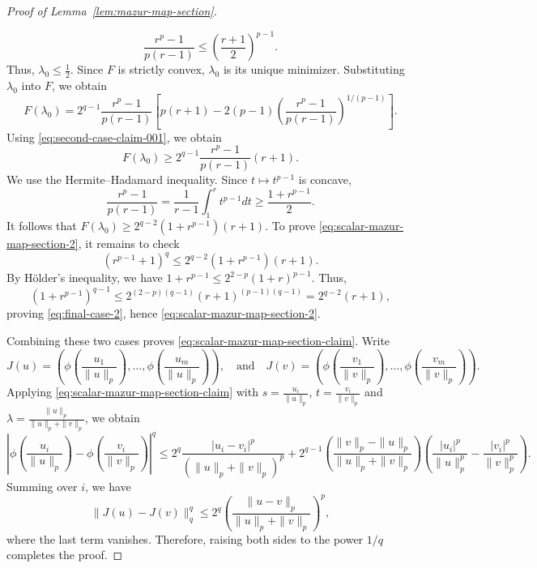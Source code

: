 \documentclass[10pt,a4paper]{amsart}
\begin{document}
\begin{proof}[Proof of Lemma~\ref{lem:mazur-map-section}]
\begin{enumerate}[wide =0pt, labelwidth= 1.1cm]
\begin{equation} \label{eq:second-case-claim-001}
\frac{r^p-1}{p(r-1)} \leq \left(\frac{r+1}{2}\right)^{p-1}.
\end{equation}
Thus, $\lambda_0 \leq \frac{1}{2}$. Since $F$ is strictly convex, $\lambda_0$ is its unique minimizer. Substituting $\lambda_0$ into $F$, we obtain
\[
    F(\lambda_0 ) = 2^{q-1} \frac{r^p-1}{p(r-1)}\left[p(r+1)-2(p-1)\left(\frac{r^p-1}{p(r-1)}\right)^{1 /(p-1)}\right].
\]
Using \eqref{eq:second-case-claim-001}, we obtain
$$
F\left(\lambda_0\right) \geq 2^{q-1} \frac{r^p-1}{p(r-1)}(r+1) .
$$
We use the Hermite--Hadamard inequality. Since $t \mapsto t^{p-1}$ is concave,
$$
\frac{r^p-1}{p(r-1)}=\frac{1}{r-1} \int_1^r t^{p-1} d t \geq \frac{1+r^{p-1}}{2}.
$$
It follows that
$
F\left(\lambda_0\right) \geq 2^{q-2}\left(1+r^{p-1}\right)(r+1) .
$
To prove \eqref{eq:scalar-mazur-map-section-2}, it remains to check
\begin{equation} \label{eq:final-case-2}
\left(r^{p-1}+1\right)^q \leq 2^{q-2}\left(1+r^{p-1}\right)(r+1).
\end{equation}
By H\"older's inequality, we have
$
1+r^{p-1} \leq 2^{2-p}(1+r)^{p-1} .
$
Thus,
$$
    \left(1+r^{p-1}\right)^{q-1}  \leq 2^{(2-p)(q-1)}(r+1)^{(p-1)(q-1)}  =2^{q-2}(r+1) ,
    $$
    proving \eqref{eq:final-case-2}, hence \eqref{eq:scalar-mazur-map-section-2}.
\end{enumerate}

    Combining these two cases proves \eqref{eq:scalar-mazur-map-section-claim}. 
    Write
    \[
    J(u)=\left(\phi\left(\frac{u_1}{\|u\|_p}\right), \ldots, \phi\left(\frac{u_m}{\|u\|_p}\right)\right),
    \quad \text{and}\quad
    J(v)=\left(\phi\left(\frac{v_1}{\|v\|_p}\right), \ldots, \phi\left(\frac{v_m}{\|v\|_p}\right)\right).
\]
Applying \eqref{eq:scalar-mazur-map-section-claim} with
$s=\frac{u_i}{\|u\|_p}$, $t=\frac{v_i}{\|v\|_p}$ and $\lambda = \frac{\|u\|_p}{\|u\|_p + \|v\|_p}$, we obtain
\[
\left|\phi\left(\frac{u_i}{\|u\|_p}\right)-\phi\left(\frac{v_i}{\|v\|_p}\right)\right|^q
    \leq
    2^q\frac{|u_i -v_i|^p}{(\|u\|_p + \|v\|_p)^p}
    +
    2^{q-1}\left(\frac{\|v\|_p - \|u\|_p}{\|u\|_p + \|v\|_p}\right)
    \left(\frac{\left|u_i\right|^p}{\|u\|_p^p}-\frac{\left|v_i\right|^p}{\|v\|_p^p}\right).
\]
Summing over $i$, we have
\[
    \|J(u)-J(v)\|_q^q
    \leq
    2^q
    \left(
        \frac{\|u-v\|_p}
        {\|u\|_p+\|v\|_p}
    \right)^p,
\]
where the last term vanishes. Therefore, raising both sides to the power $1 / q$ completes the proof.
\end{proof}
\end{document}
